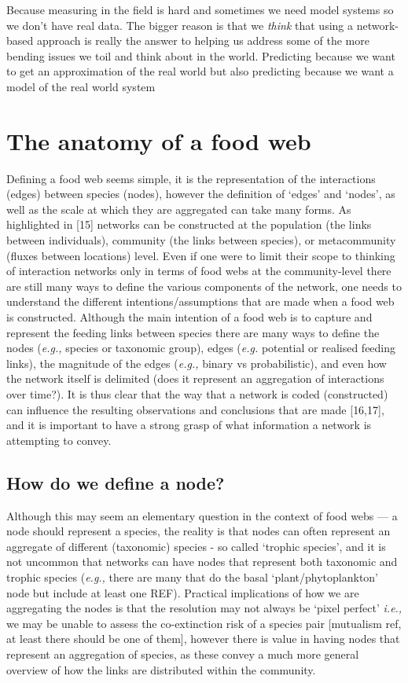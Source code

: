 \documentclass[
]{article}
\begin{document}
Because measuring in the field is hard and sometimes we need model
systems so we don't have real data. The bigger reason is that we
\emph{think} that using a network-based approach is really the answer to
helping us address some of the more bending issues we toil and think
about in the world. Predicting because we want to get an approximation
of the real world but also predicting because we want a model of the
real world system

\section{The anatomy of a food web}\label{sec-network-anatomy}

Defining a food web seems simple, it is the representation of the
interactions (edges) between species (nodes), however the definition of
`edges' and `nodes', as well as the scale at which they are aggregated
can take many forms. As highlighted in {[}15{]} networks can be
constructed at the population (the links between individuals), community
(the links between species), or metacommunity (fluxes between locations)
level. Even if one were to limit their scope to thinking of interaction
networks only in terms of food webs at the community-level there are
still many ways to define the various components of the network, one
needs to understand the different intentions/assumptions that are made
when a food web is constructed. Although the main intention of a food
web is to capture and represent the feeding links between species there
are many ways to define the nodes (\emph{e.g.,} species or taxonomic
group), edges (\emph{e.g.} potential or realised feeding links), the
magnitude of the edges (\emph{e.g.,} binary vs probabilistic), and even
how the network itself is delimited (does it represent an aggregation of
interactions over time?). It is thus clear that the way that a network
is coded (constructed) can influence the resulting observations and
conclusions that are made {[}16,17{]}, and it is important to have a
strong grasp of what information a network is attempting to convey.

\subsection{How do we define a node?}\label{how-do-we-define-a-node}

Although this may seem an elementary question in the context of food
webs --- a node should represent a species, the reality is that nodes
can often represent an aggregate of different (taxonomic) species - so
called `trophic species', and it is not uncommon that networks can have
nodes that represent both taxonomic and trophic species (\emph{e.g.,}
there are many that do the basal `plant/phytoplankton' node but include
at least one REF). Practical implications of how we are aggregating the
nodes is that the resolution may not always be `pixel perfect'
\emph{i.e.,} we may be unable to assess the co-extinction risk of a
species pair {[}mutualism ref, at least there should be one of them{]},
however there is value in having nodes that represent an aggregation of
species, as these convey a much more general overview of how the links
are distributed within the community.
\end{document}
